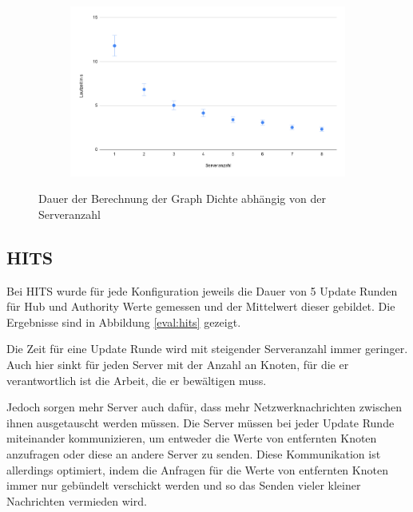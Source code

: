 \begin{figure}
  \centering
  \begin{subfigure}[b]{1.0\textwidth}
    \includegraphics[width=1.0\linewidth]{img/eval_density.png}
  \end{subfigure}
  \caption{Dauer der Berechnung der Graph Dichte abhängig von der Serveranzahl}
  \label{eval:density}
\end{figure}



\subsection{HITS}

Bei HITS wurde für jede Konfiguration jeweils die Dauer von 5 Update Runden für Hub und Authority Werte gemessen und der Mittelwert dieser gebildet. Die Ergebnisse sind in Abbildung \ref{eval:hits} gezeigt.

Die Zeit für eine Update Runde wird mit steigender Serveranzahl immer geringer. Auch hier sinkt für jeden Server mit der Anzahl an Knoten, für die er verantwortlich ist die Arbeit, die er bewältigen muss.

Jedoch sorgen mehr Server auch dafür, dass mehr Netzwerknachrichten zwischen ihnen ausgetauscht werden müssen.
Die Server müssen bei jeder Update Runde miteinander kommunizieren, um entweder die Werte von entfernten Knoten anzufragen oder diese an andere Server zu senden. 
Diese Kommunikation ist allerdings optimiert, indem die Anfragen für die Werte von entfernten Knoten immer nur gebündelt verschickt werden und so das Senden vieler kleiner Nachrichten vermieden wird.



